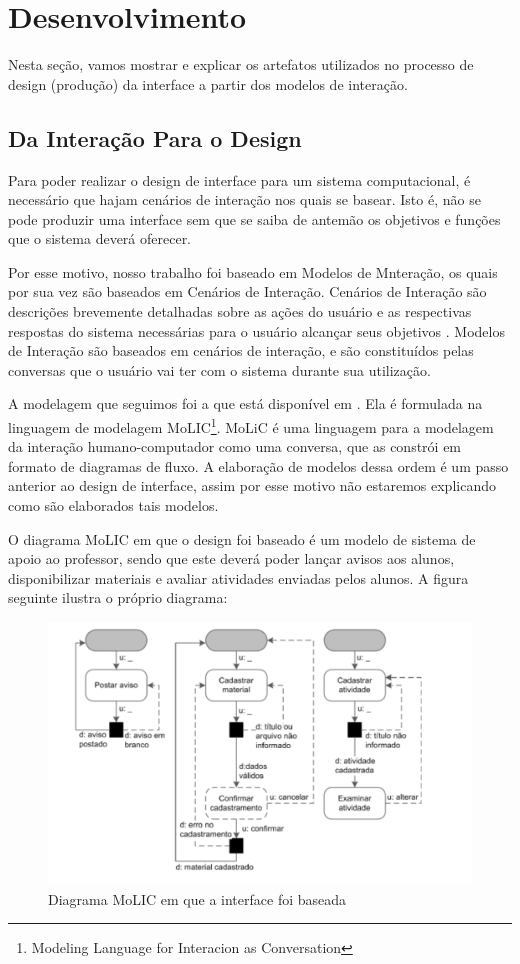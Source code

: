 \section{Desenvolvimento}
	Nesta seção, vamos mostrar e explicar os artefatos utilizados no processo de 
	design (produção) da interface a partir dos modelos de interação.
	\subsection{Da Interação Para o Design}
		Para poder realizar o design de interface para um sistema computacional, é necessário que hajam cenários 
		de interação nos quais se basear. Isto é, não se pode produzir uma interface 
		sem que se saiba de antemão os objetivos e funções que o sistema deverá oferecer.
		
		Por esse motivo, nosso trabalho foi baseado em Modelos de Mnteração, os 
		quais por sua vez são baseados em Cenários de Interação. Cenários de Interação 
		são descrições brevemente detalhadas sobre as ações do usuário e as respectivas
		respostas do sistema necessárias para o usuário alcançar seus objetivos \cite{ihc:barsil}. 
		Modelos de Interação são baseados em cenários de interação, e são constituídos 
		pelas conversas que o usuário vai ter com o sistema durante sua utilização.
		
		A modelagem que seguimos foi a que está disponível em \cite{ihc:barsil}. Ela 
		é formulada na linguagem de modelagem MoLIC\footnote{Modeling Language for Interacion 
		as Conversation}. MoLiC é uma linguagem para a modelagem da interação humano-computador
		como uma conversa, que as constrói em formato de diagramas de fluxo. A 
		elaboração de modelos dessa ordem é um passo anterior 
		ao design de interface, assim por esse motivo não estaremos explicando como 
		são elaborados tais modelos.
		
		O diagrama MoLIC em que o design foi baseado é um modelo de sistema de apoio 
		ao professor, sendo que este deverá poder lançar avisos aos alunos, disponibilizar 
		materiais e avaliar atividades enviadas pelos alunos. A figura seguinte ilustra 
		o próprio diagrama:
		
		\begin{figure}[!ht]
			\centering
			\includegraphics[scale=0.7]{molic.pdf}
			\caption{Diagrama MoLIC em que a interface foi baseada}
		\end{figure}
		
